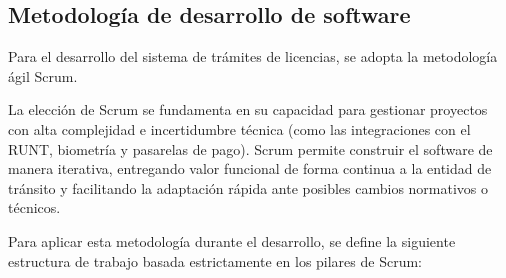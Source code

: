 \subsection{Metodología de desarrollo de software}

Para el desarrollo del sistema de trámites de licencias, se adopta la metodología ágil Scrum. 

La elección de Scrum se fundamenta en su capacidad para gestionar proyectos con alta complejidad e incertidumbre técnica (como las integraciones con el RUNT, biometría y pasarelas de pago). Scrum permite construir el software de manera iterativa, entregando valor funcional de forma continua a la entidad de tránsito y facilitando la adaptación rápida ante posibles cambios normativos o técnicos.

Para aplicar esta metodología durante el desarrollo, se define la siguiente estructura de trabajo basada estrictamente en los pilares de Scrum:

